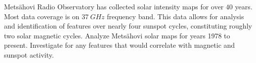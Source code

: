 \documentclass{aa}
\begin{document}
  \abstract
  {
    Mets\"ahovi Radio Observatory has collected solar intensity maps for
    over $40$ years.
    Most data coverage is on $\SI{37}{GHz}$ frequency band.
    This data allows for analysis and identification of features over nearly
    four sunspot cycles, constituting roughly two solar magnetic cycles.
  }
  {
    Analyze Metsähovi solar maps for years 1978 to present.
    Investigate for any features that would correlate with magnetic and
    sunspot activity.
  }
\end{document}

